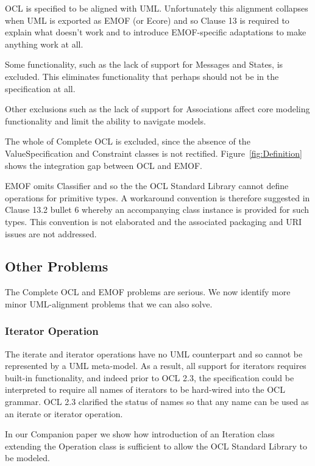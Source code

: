 \documentclass{eceasst}
\begin{document}
OCL is specified to be aligned with UML. Unfortunately this alignment collapses when UML is exported as EMOF (or Ecore) and so Clause 13 is required to explain what doesn't work and to introduce EMOF-specific adaptations to make anything work at all.

Some functionality, such as the lack of support for Messages and States,  is excluded. This eliminates functionality that perhaps should not be in the specification at all.

Other exclusions such as the lack of support for Associations affect core modeling functionality and limit the ability to navigate models.

The whole of Complete OCL is excluded, since the absence of the ValueSpecification and Constraint classes is not rectified. Figure~\ref{fig:Definition} shows the integration gap between OCL and EMOF.

EMOF omits Classifier and so the the OCL Standard Library cannot define operations for primitive types. A workaround convention is therefore suggested in  Clause 13.2 bullet 6 whereby an accompanying class instance is provided for such types. This convention is not elaborated and the associated packaging and URI issues are not addressed.

\subsection{Other Problems}

The Complete OCL and EMOF problems are serious. We now identify more minor UML-alignment problems that we can also solve. 

\subsubsection{Iterator Operation}

The iterate and iterator operations have no UML counterpart and so cannot be represented by a UML meta-model. As a result, all support for iterators requires built-in functionality, and indeed prior to OCL 2.3, the specification could be interpreted to require all names of iterators to be hard-wired into the OCL grammar. OCL 2.3 clarified the status of names so that any name can be used as an iterate or iterator operation.

In our Companion paper\cite{OCL-stdlib} we show how introduction of an Iteration class extending the Operation class is sufficient to allow the OCL Standard Library to be modeled.
\end{document}
